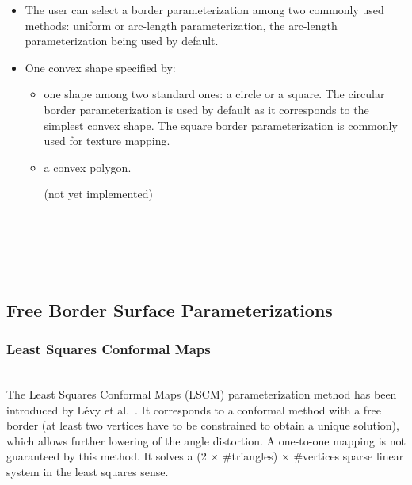 \begin{itemize}

\item The user can select a border parameterization among
two commonly used methods: uniform or arc-length parameterization, the
arc-length parameterization being used by default.

\item One convex shape specified by:

    \begin{itemize}

    \item one shape among two standard ones: a circle or a square.
    The circular border parameterization is used by default as it
    corresponds to the simplest convex shape. The square border
    parameterization is commonly used for texture mapping.

    \item a convex polygon.

    (not yet implemented)

    \end{itemize}

\end{itemize}

  \\
  \\
  \\
  \\


\subsection{Free Border Surface Parameterizations}

\subsubsection{Least Squares Conformal Maps}

  \\

The Least Squares Conformal Maps (LSCM) parameterization method has
been introduced by L\'evy et al.~\cite{cgal:lprm-lscm-02}. It
corresponds to a conformal method with a free border (at least two
vertices have to be constrained to obtain a unique solution), which
allows further lowering of the angle distortion. A one-to-one mapping
is not guaranteed by this method. It solves a (2 $\times$
\#triangles) $\times$ \#vertices sparse linear system in the least squares sense.

